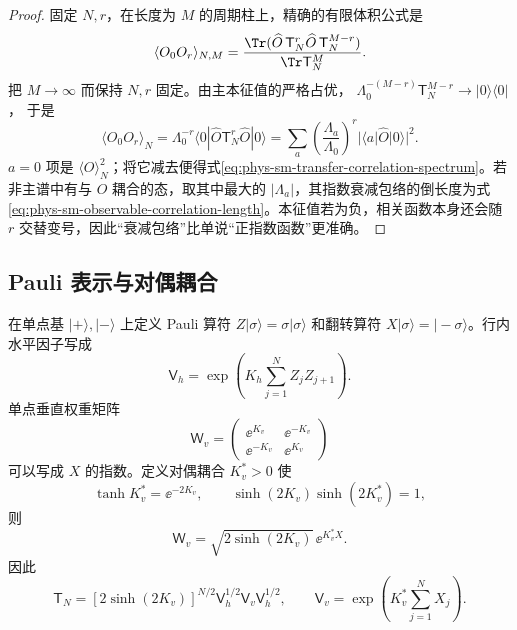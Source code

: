 \begin{proof}
固定 \(N,r\)，在长度为 \(M\) 的周期柱上，精确的有限体积公式是
\[
\langle O_0O_r\rangle_{N,M}
=\frac{\Tr(\widehat O\,\mathsf T_N^r\widehat O\,
\mathsf T_N^{M-r})}{\Tr\mathsf T_N^M}.
\]
把 \(M\to\infty\) 而保持 \(N,r\) 固定。由主本征值的严格占优，
\(\Lambda_0^{-(M-r)}\mathsf T_N^{M-r}\to|0\rangle\langle0|\)，
于是
\[
\langle O_0O_r\rangle_N
=\Lambda_0^{-r}\langle0|\widehat O\mathsf T_N^r\widehat O|0\rangle
=\sum_a\left(\frac{\Lambda_a}{\Lambda_0}\right)^r
|\langle a|\widehat O|0\rangle|^2.
\]
\(a=0\) 项是 \(\langle O\rangle_N^2\)；将它减去便得式\cref{eq:phys-sm-transfer-correlation-spectrum}。若非主谱中有与 \(O\) 耦合的态，取其中最大的 \(|\Lambda_a|\)，其指数衰减包络的倒长度为式\cref{eq:phys-sm-observable-correlation-length}。本征值若为负，相关函数本身还会随 \(r\) 交替变号，因此“衰减包络”比单说“正指数函数”更准确。
\end{proof}

\subsection{Pauli 表示与对偶耦合}
\label{sec:phys-sm-pauli}

在单点基 \(|+\rangle,|-\rangle\) 上定义 Pauli 算符 \(Z|\sigma\rangle=\sigma|\sigma\rangle\) 和翻转算符 \(X|\sigma\rangle=|-\sigma\rangle\)。行内水平因子写成
\begin{equation}
 \mathsf V_h
 =\exp\!\left(K_h\sum_{j=1}^{N}Z_jZ_{j+1}\right).
 \label{eq:phys-sm-horizontal-transfer-factor}
\end{equation}
单点垂直权重矩阵
\[
 \mathsf W_v=
 \begin{pmatrix}
 \ee^{K_v}&\ee^{-K_v}\\
 \ee^{-K_v}&\ee^{K_v}
 \end{pmatrix}
\]
可以写成 \(X\) 的指数。定义对偶耦合 \(K_v^*>0\) 使
\begin{equation}
 \tanh K_v^*=\ee^{-2K_v},
 \qquad
 \sinh(2K_v)\sinh(2K_v^*)=1,
 \label{eq:phys-sm-vertical-dual-coupling}
\end{equation}
则
\begin{equation}
 \mathsf W_v
 =\sqrt{2\sinh(2K_v)}\,\ee^{K_v^*X}.
 \label{eq:phys-sm-vertical-pauli-factor}
\end{equation}
因此
\begin{equation}
 \mathsf T_N
 =\left[2\sinh(2K_v)\right]^{N/2}
 \mathsf V_h^{1/2}\mathsf V_v\mathsf V_h^{1/2},
 \qquad
 \mathsf V_v=\exp\!\left(K_v^*\sum_{j=1}^{N}X_j\right).
 \label{eq:phys-sm-transfer-pauli-factorization}
\end{equation}

